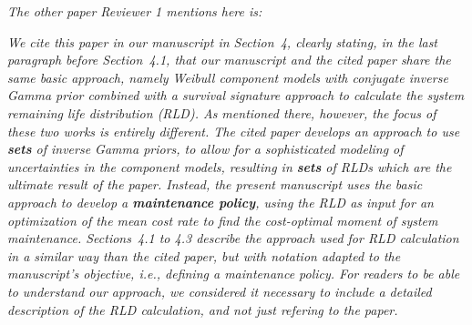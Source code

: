 \documentclass[authoryear]{elsarticle}
\begin{document}
\smallskip

\emph{The other paper Reviewer 1 mentions here is:}

\nocite{2016:walter-coolen}


\smallskip

\emph{We cite this paper in our manuscript in Section~4,
clearly stating, in the last paragraph before Section~4.1,
that our manuscript and the cited paper share the same basic approach, namely
Weibull component models with conjugate inverse Gamma prior
combined with a survival signature approach to calculate the system remaining life distribution (RLD).
As mentioned there, however, the focus of these two works is entirely different.
The cited paper develops an approach to use \textbf{sets} of inverse Gamma priors,
to allow for a sophisticated modeling of uncertainties in the component models,
resulting in \textbf{sets} of RLDs which are the ultimate result of the paper.
Instead, the present manuscript uses the basic approach to develop a \textbf{maintenance policy},
using the RLD as input for an optimization of the mean cost rate to find the cost-optimal moment of system maintenance.
Sections~4.1 to 4.3 describe the approach used for RLD calculation
in a similar way than the cited paper,
but with notation adapted to the manuscript's objective, i.e., defining a maintenance policy.
For readers to be able to understand our approach,
we considered it necessary to include a detailed description of the RLD calculation,
and not just refering to the paper.
}

\medskip
\end{document}
